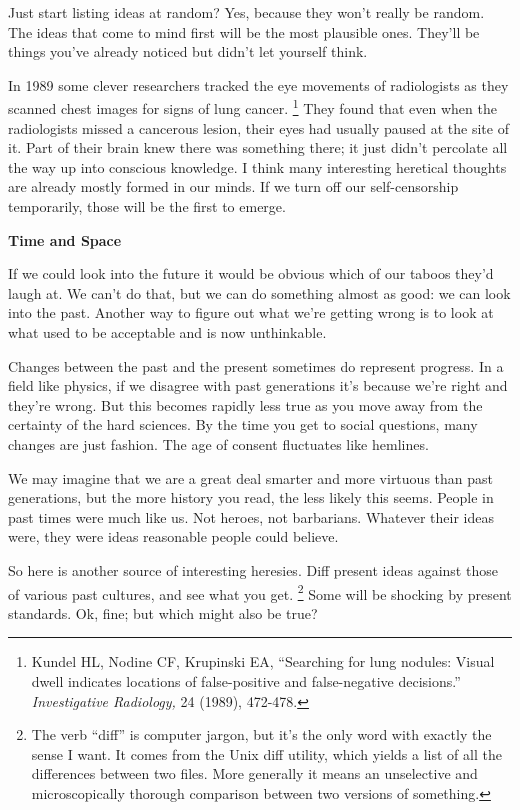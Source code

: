 \documentclass[12pt]{book}
\begin{document}
Just start listing ideas at random? Yes, because they won't really be
random. The ideas that come to mind first will be the most plausible
ones. They'll be things you've already noticed but didn't let yourself
think.

In 1989 some clever researchers tracked the eye movements of
radiologists as they scanned chest images for signs of lung cancer.
\footnote{Kundel HL, Nodine CF, Krupinski EA, ``Searching for lung
nodules: Visual dwell indicates locations of false-positive and
false-negative decisions.'' \emph{Investigative Radiology,} 24 (1989),
472-478.} They found that even when the radiologists missed a cancerous
lesion, their eyes had usually paused at the site of it. Part of their
brain knew there was something there; it just didn't percolate all the
way up into conscious knowledge. I think many interesting heretical
thoughts are already mostly formed in our minds. If we turn off our
self-censorship temporarily, those will be the first to emerge.

\textbf{Time and Space}

If we could look into the future it would be obvious which of our taboos
they'd laugh at. We can't do that, but we can do something almost as
good: we can look into the past. Another way to figure out what we're
getting wrong is to look at what used to be acceptable and is now
unthinkable.

Changes between the past and the present sometimes do represent
progress. In a field like physics, if we disagree with past generations
it's because we're right and they're wrong. But this becomes rapidly
less true as you move away from the certainty of the hard sciences. By
the time you get to social questions, many changes are just fashion. The
age of consent fluctuates like hemlines.

We may imagine that we are a great deal smarter and more virtuous than
past generations, but the more history you read, the less likely this
seems. People in past times were much like us. Not heroes, not
barbarians. Whatever their ideas were, they were ideas reasonable people
could believe.

So here is another source of interesting heresies. Diff present ideas
against those of various past cultures, and see what you get. \footnote{The verb ``diff'' is computer jargon, but it's the only word
with exactly the sense I want. It comes from the Unix diff utility,
which yields a list of all the differences between two files. More
generally it means an unselective and microscopically thorough
comparison between two versions of something.}
Some will be shocking by present standards. Ok, fine; but which might
also be true?
\end{document}
